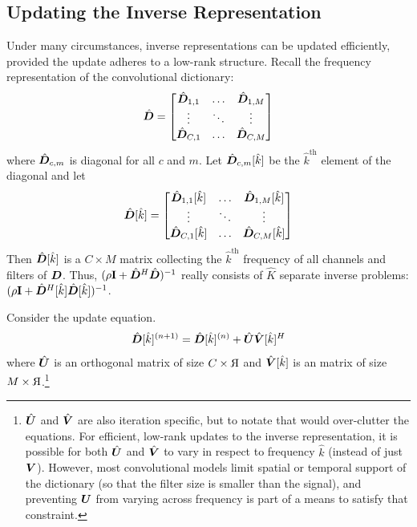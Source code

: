 \subsection{Updating the Inverse Representation}

Under many circumstances, inverse representations can be updated efficiently, provided the update adheres to a low-rank structure. Recall the frequency representation of the convolutional dictionary:
%
\begin{equation}
\hat{\bm{D}} = \begin{bmatrix}
\hat{\bm{D}}_{1,1} & \hdots & \hat{\bm{D}}_{1,M}\\
\vdots & \ddots & \vdots\\
\hat{\bm{D}}_{C,1} & \hdots & \hat{\bm{D}}_{C,M}
\end{bmatrix}
\end{equation}
%
where $\hat{\bm{D}}_{c,m}$ is diagonal for all $c$ and $m$. Let $\hat{\bm{D}}_{c,m}[\hat{k}]$ be the $\hat{k}^{\text{th}}$ element of the diagonal and let
%
\begin{equation}
\hat{\bm{D}}[\hat{k}] = \begin{bmatrix}
\hat{\bm{D}}_{1,1}[\hat{k}] & \hdots & \hat{\bm{D}}_{1,M}[\hat{k}]\\
\vdots & \ddots & \vdots\\
\hat{\bm{D}}_{C,1}[\hat{k}] & \hdots & \hat{\bm{D}}_{C,M}[\hat{k}]
\end{bmatrix}
\end{equation}
%
Then $\hat{\bm{D}}[\hat{k}]$ is a $C \times M$ matrix collecting the $\hat{k}^{\text{th}}$ frequency of all channels and filters of $\bm{D}$. Thus, $(\rho{\bf I} + \hat{\bm{D}}^H\hat{\bm{D}})^{-1}$ really consists of $\hat{K}$ separate inverse problems: $(\rho{\bf I} + \hat{\bm{D}}^H[\hat{k}]\hat{\bm{D}}[\hat{k}])^{-1}$.

Consider the update equation.
%
\begin{equation}
\hat{\bm{D}}[\hat{k}]^{(n + 1)} = \hat{\bm{D}}[\hat{k}]^{(n)} + \hat{\bm{U}}\hat{\bm{V}}[\hat{k}]^H
\end{equation}
%
where $\hat{\bm{U}}$ is an orthogonal matrix of size $C \times 
\reflectbox{R}$ and $\hat{\bm{V}}[\hat{k}]$ is an matrix of size $M \times 
\reflectbox{R}$.\footnote{$\hat{\bm{U}}$ and $\hat{\bm{V}}$ are also iteration specific, but to notate that would over-clutter the equations. For efficient, low-rank updates to the inverse representation, it is possible for both $\hat{\bm{U}}$ and $\hat{\bm{V}}$ to vary in respect to frequency $\hat{k}$ (instead of just $\bm{V}$). However, most convolutional models limit spatial or temporal support of the dictionary (so that the filter size is smaller than the signal), and preventing $\bm{U}$ from varying across frequency is part of a means to satisfy that constraint.}

